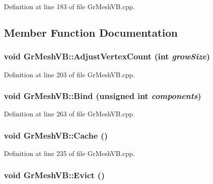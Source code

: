 Definition at line 183 of file GrMeshVB.cpp.

\subsection{Member Function Documentation}
\hypertarget{class_gr_mesh_v_b_c19226bb73e91cba8be18520a8f8749f}{
\subsubsection[{AdjustVertexCount}]{\setlength{\rightskip}{0pt plus 5cm}void GrMeshVB::AdjustVertexCount (int {\em growSize})}}
\label{class_gr_mesh_v_b_c19226bb73e91cba8be18520a8f8749f}




Definition at line 203 of file GrMeshVB.cpp.\hypertarget{class_gr_mesh_v_b_0be3a29d9a24b3766140acaa31f5064d}{
\subsubsection[{Bind}]{\setlength{\rightskip}{0pt plus 5cm}void GrMeshVB::Bind (unsigned int {\em components})}}
\label{class_gr_mesh_v_b_0be3a29d9a24b3766140acaa31f5064d}




Definition at line 263 of file GrMeshVB.cpp.\hypertarget{class_gr_mesh_v_b_d89095e9dbcb97718889fc4096c5a9d2}{
\subsubsection[{Cache}]{\setlength{\rightskip}{0pt plus 5cm}void GrMeshVB::Cache ()}}
\label{class_gr_mesh_v_b_d89095e9dbcb97718889fc4096c5a9d2}




Definition at line 235 of file GrMeshVB.cpp.\hypertarget{class_gr_mesh_v_b_ee65428228e554cd769c6b0af3ff9c13}{
\subsubsection[{Evict}]{\setlength{\rightskip}{0pt plus 5cm}void GrMeshVB::Evict ()}}
\label{class_gr_mesh_v_b_ee65428228e554cd769c6b0af3ff9c13}




